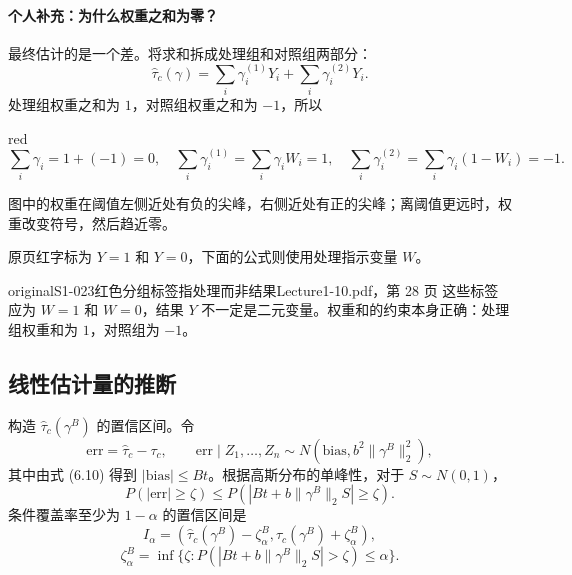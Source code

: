 \paragraph{个人补充：为什么权重之和为零？}
最终估计的是一个差。将求和拆成处理组和对照组两部分：
\[
\widehat\tau_c(\gamma)=\sum_i\gamma_i^{(1)}Y_i+\sum_i\gamma_i^{(2)}Y_i.
\]
处理组权重之和为 $1$，对照组权重之和为 $-1$，所以

\begin{inkblock}{red}
\[
\sum_i\gamma_i=1+(-1)=0,\quad
\sum_i\gamma_i^{(1)}=\sum_i\gamma_iW_i=1,\quad
\sum_i\gamma_i^{(2)}=\sum_i\gamma_i(1-W_i)=-1.
\]
\end{inkblock}

图中的权重在阈值左侧近处有负的尖峰，右侧近处有正的尖峰；离阈值更远时，权重改变符号，然后趋近零。
\begin{center}\end{center}
原页红字标为 $Y=1$ 和 $Y=0$，下面的公式则使用处理指示变量 $W$。
\begin{reviewnote}{original}{S1-023}{红色分组标签指处理而非结果}{Lecture1-10.pdf，第 28 页}
这些标签应为 $W=1$ 和 $W=0$，结果 $Y$ 不一定是二元变量。权重和的约束本身正确：处理组权重和为 $1$，对照组为 $-1$。
\end{reviewnote}

\subsection{线性估计量的推断}
构造 $\widehat\tau_c(\gamma^B)$ 的置信区间。令
\[
\mathrm{err}=\widehat\tau_c-\tau_c,\qquad
\mathrm{err}\mid Z_1,\ldots,Z_n\sim N(\mathrm{bias},b^2\|\gamma^B\|_2^2),
\]
其中由式 (6.10) 得到 $|\mathrm{bias}|\leq Bt$。根据高斯分布的单峰性，对于 $S\sim N(0,1)$，
\[
P(|\mathrm{err}|\geq\zeta)\leq P(|Bt+b\|\gamma^B\|_2S|\geq\zeta).
\]
条件覆盖率至少为 $1-\alpha$ 的置信区间是
\[
I_\alpha=(\widehat\tau_c(\gamma^B)-\zeta_\alpha^B,
\widehat\tau_c(\gamma^B)+\zeta_\alpha^B),
\]
\[
\zeta_\alpha^B=\inf\{\zeta:P(|Bt+b\|\gamma^B\|_2S|>\zeta)\leq\alpha\}.
\tag{原笔记 6.13}
\]

